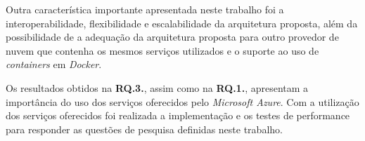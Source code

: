 Outra característica importante apresentada neste trabalho foi a interoperabilidade, flexibilidade e escalabilidade da arquitetura proposta, além da possibilidade de a adequação da arquitetura proposta para outro provedor de nuvem que contenha os mesmos serviços utilizados e o suporte ao uso de \textit{containers} em \textit{Docker}.

Os resultados obtidos na \textbf{RQ.3.}, assim como na \textbf{RQ.1.}, apresentam a importância do uso dos serviços oferecidos pelo \textit{Microsoft Azure}. Com a utilização dos serviços oferecidos foi realizada a implementação e os testes de performance para responder as questões de pesquisa definidas neste trabalho.